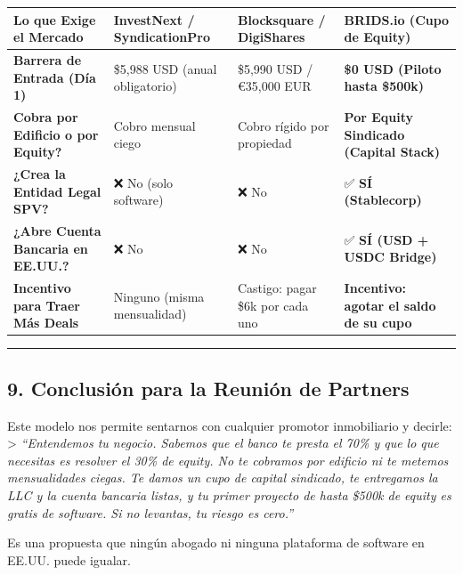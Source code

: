 \documentclass[
]{article}
\newcounter{none} %
\begin{document}
{\def\LTcaptype{none} %
\begin{longtable}[]{@{}
  >{\raggedright\arraybackslash}p{}
  >{\centering\arraybackslash}p{}
  >{\centering\arraybackslash}p{}
  >{\centering\arraybackslash}p{}@{}}
\toprule\noalign{}
\begin{minipage}[b]{\linewidth}\raggedright
Lo que Exige el Mercado
\end{minipage} & \begin{minipage}[b]{\linewidth}\centering
InvestNext / SyndicationPro
\end{minipage} & \begin{minipage}[b]{\linewidth}\centering
Blocksquare / DigiShares
\end{minipage} & \begin{minipage}[b]{\linewidth}\centering
\textbf{BRIDS.io (Cupo de Equity)}
\end{minipage} \\
\midrule\noalign{}
\endhead
\bottomrule\noalign{}
\endlastfoot
\textbf{Barrera de Entrada (Día 1)} & \$5,988 USD (anual obligatorio) &
\$5,990 USD / €35,000 EUR & \textbf{\$0 USD (Piloto hasta \$500k)} \\
\textbf{Cobra por Edificio o por Equity?} & Cobro mensual ciego & Cobro
rígido por propiedad & \textbf{Por Equity Sindicado (Capital Stack)} \\
\textbf{¿Crea la Entidad Legal SPV?} & ❌ No (solo software) & ❌ No &
✅ \textbf{SÍ (Stablecorp)} \\
\textbf{¿Abre Cuenta Bancaria en EE.UU.?} & ❌ No & ❌ No & ✅
\textbf{SÍ (USD + USDC Bridge)} \\
\textbf{Incentivo para Traer Más Deals} & Ninguno (misma mensualidad) &
Castigo: pagar \$6k por cada uno & \textbf{Incentivo: agotar el saldo de
su cupo} \\
\end{longtable}
}

\begin{center}\rule{0.5\linewidth}{0.5pt}\end{center}

\subsection{9. Conclusión para la Reunión de
Partners}\label{conclusiuxf3n-para-la-reuniuxf3n-de-partners}

Este modelo nos permite sentarnos con cualquier promotor inmobiliario y
decirle: \textgreater{} \emph{``Entendemos tu negocio. Sabemos que el
banco te presta el 70\% y que lo que necesitas es resolver el 30\% de
equity. No te cobramos por edificio ni te metemos mensualidades ciegas.
Te damos un cupo de capital sindicado, te entregamos la LLC y la cuenta
bancaria listas, y tu primer proyecto de hasta \$500k de equity es
gratis de software. Si no levantas, tu riesgo es cero.''}

Es una propuesta que ningún abogado ni ninguna plataforma de software en
EE.UU. puede igualar.
\end{document}
